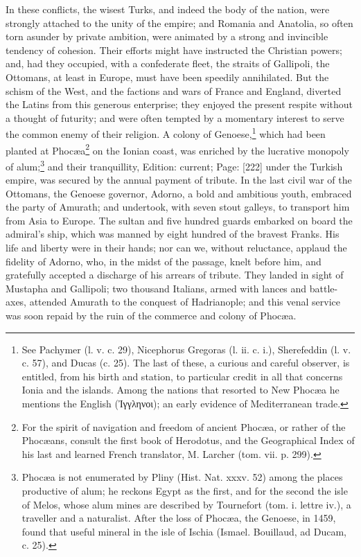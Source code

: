 In these conflicts, the wisest Turks, and indeed the body of the nation, were strongly attached to the unity of the empire; and Romania and Anatolia, so often torn asunder by private ambition, were animated by a strong and invincible tendency of cohesion. Their efforts might have instructed the Christian powers; and, had they occupied, with a confederate fleet, the straits of Gallipoli, the Ottomans, at least in Europe, must have been speedily annihilated. But the schism of the West, and the factions and wars of France and England, diverted the Latins from this generous enterprise; they enjoyed the present respite without a thought of futurity; and were often tempted by a momentary interest to serve the common enemy of their religion. A colony of Genoese,\footnote{See Pachymer (l. v. c. 29), Nicephorus Gregoras (l. ii. c. i.), Sherefeddin (l. v. c. 57), and Ducas (c. 25). The last of these, a curious and careful observer, is entitled, from his birth and station, to particular credit in all that concerns Ionia and the islands. Among the nations that resorted to New Phocæa he mentions the English (\textgreek{\texthebrew{Ἰ}γγληνοι}); an early evidence of Mediterranean trade.} which had been planted at Phocæa\footnote{For the spirit of navigation and freedom of ancient Phocæa, or rather of the Phocæans, consult the first book of Herodotus, and the Geographical Index of his last and learned French translator, M. Larcher (tom. vii. p. 299).} on the Ionian coast, was enriched by the lucrative monopoly of alum;\footnote{Phocæa is not enumerated by Pliny (Hist. Nat. xxxv. 52) among the places productive of alum; he reckons Egypt as the first, and for the second the isle of Melos, whose alum mines are described by Tournefort (tom. i. lettre iv.), a traveller and a naturalist. After the loss of Phocæa, the Genoese, in 1459, found that useful mineral in the isle of Ischia (Ismael. Bouillaud, ad Ducam, c. 25).} and their tranquillity, Edition: current; Page: [222] under the Turkish empire, was secured by the annual payment of tribute. In the last civil war of the Ottomans, the Genoese governor, Adorno, a bold and ambitious youth, embraced the party of Amurath; and undertook, with seven stout galleys, to transport him from Asia to Europe. The sultan and five hundred guards embarked on board the admiral\texthebrew{}’s ship, which was manned by eight hundred of the bravest Franks. His life and liberty were in their hands; nor can we, without reluctance, applaud the fidelity of Adorno, who, in the midst of the passage, knelt before him, and gratefully accepted a discharge of his arrears of tribute. They landed in sight of Mustapha and Gallipoli; two thousand Italians, armed with lances and battle-axes, attended Amurath to the conquest of Hadrianople; and this venal service was soon repaid by the ruin of the commerce and colony of Phocæa.

